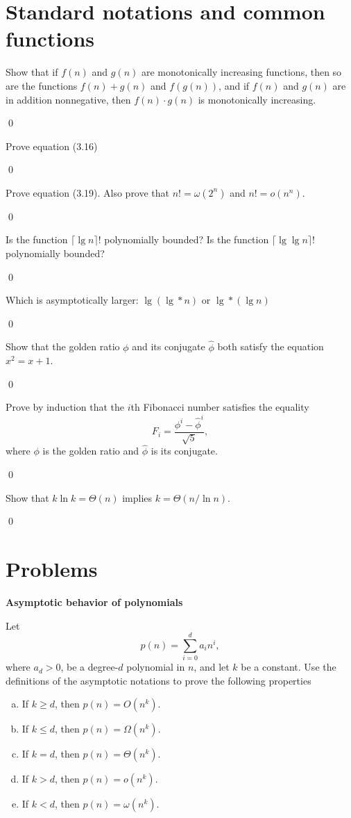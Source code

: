 \section{Standard notations and common functions}

 Show that if $f(n)$ and $g(n)$ are monotonically increasing functions, then so are the functions $f(n) + g(n)$ and $f(g(n))$, and if $f(n)$ and $g(n)$ are in addition nonnegative, then $f(n) \cdot g(n)$ is monotonically increasing.

\sol \qed

 Prove equation (3.16)

\pf \qed

 Prove equation (3.19). Also prove that $n! = \omega(2^n)$ and $n! = o(n^n)$.

\pf \qed

 Is the function $\lceil \lg n \rceil !$ polynomially bounded? Is the function $\lceil \lg \lg n \rceil !$ polynomially bounded?

\sol \qed

 Which is asymptotically larger: $\lg(\lg * n)$ or $\lg * (\lg n)$

\sol \qed

 Show that the golden ratio $\phi$ and its conjugate $\hat{\phi}$ both satisfy the equation $x^2 = x + 1$.

\sol \qed

 Prove by induction that the $i$th Fibonacci number satisfies the equality $$F_i = \frac{\phi^i - \hat{\phi}^i}{\sqrt{5}},$$ where $\phi$ is the golden ratio and $\hat{\phi}$ is its conjugate.

\pf \qed

 Show that $k \ln k = \Theta(n)$ implies $k = \Theta(n / \ln n)$.

\sol \qed

\section{Problems}

 \textbf{Asymptotic behavior of polynomials}

Let $$p(n) = \sum_{i=0}^d a_i n^i,$$ where $a_d > 0$, be a degree-$d$ polynomial in $n$, and let $k$ be a constant. Use the definitions of the asymptotic notations to prove the following properties

\begin{enumerate}[(a)]
    \item If $k \geq d$, then $p(n) = O(n^k)$.
    \item If $k \leq d$, then $p(n) = \Omega(n^k)$.
    \item If $k = d$, then $p(n) = \Theta(n^k)$.
    \item If $k > d$, then $p(n) = o(n^k)$.
    \item If $k < d$, then $p(n) = \omega(n^k)$.
\end{enumerate}

